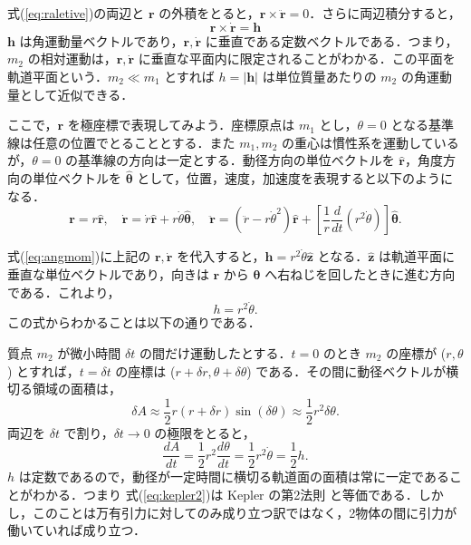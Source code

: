 \documentclass[11pt,a4paper,oneside,onecolumn]{jreport}
\begin{document}
式(\ref{eq:raletive})の両辺と ${\bm r}$ の外積をとると，${\bm r} \times \ddot{{\bm r}} = 0$．さらに両辺積分すると，
\begin{equation}
{\bm r} \times \dot{{\bm r}} = {\bm h} \label{eq:angmom}
\end{equation}
${\bm h}$ は角運動量ベクトルであり，${\bm r}, \dot{{\bm r}}$ に垂直である定数ベクトルである．つまり，$m_2$ の相対運動は，${\bm r}, \dot{{\bm r}}$ に垂直な平面内に限定されることがわかる．この平面を軌道平面という．$m_2 \ll m_1$ とすれば $h = |{\bm h}|$ は単位質量あたりの $m_2$ の角運動量として近似できる．

ここで，${\bm r}$ を極座標で表現してみよう．座標原点は $m_1$ とし，$\theta = 0$ となる基準線は任意の位置でとることとする．また $m_1, m_2$ の重心は慣性系を運動しているが，$\theta = 0$ の基準線の方向は一定とする．動径方向の単位ベクトルを $\hat{{\bm r}}$，角度方向の単位ベクトルを $\hat{{\bm \theta}}$ として，位置，速度，加速度を表現すると以下のようになる．
\begin{equation}
{\bm r} = r \hat{{\bm r}}, \quad \dot{{\bm r}} = \dot{r} \hat{{\bm r}} + r \dot{\theta} \hat{{\bm \theta}}, \quad \ddot{{\bm r}} = (\ddot{r} - r \dot{\theta}^2) \hat{{\bm r}} + \left[ \frac{1}{r} \frac{d}{dt} (r^2 \dot{\theta})\right] \hat{{\bm \theta}}. \label{eq:polar}
\end{equation}

式(\ref{eq:angmom})に上記の ${\bm r}, \dot{{\bm r}}$ を代入すると，${\bm h} = r^2 \dot{\theta} \hat{{\bm z}}$ となる．$\hat{{\bm z}}$ は軌道平面に垂直な単位ベクトルであり，向きは ${\bm r}$ から ${\bm \theta}$ へ右ねじを回したときに進む方向である．これより，
\begin{equation}
h = r^2 \dot{\theta}.
\end{equation}
この式からわかることは以下の通りである．

質点 $m_2$ が微小時間 $\delta t$ の間だけ運動したとする．$t = 0$ のとき $m_2$ の座標が ($r, \theta$) とすれば，$t = \delta t$ の座標は ($r + \delta r, \theta + \delta \theta$) である．その間に動径ベクトルが横切る領域の面積は，
\begin{equation}
\delta A \approx \frac{1}{2} r (r + \delta r) \sin (\delta \theta) \approx \frac{1}{2} r^2 \delta \theta. 
\end{equation}
両辺を $\delta t$ で割り，$\delta t \rightarrow 0$ の極限をとると，
\begin{equation}
\frac{dA}{dt} = \frac{1}{2} r^2 \frac{d \theta}{dt} = \frac{1}{2} r^2 \dot{\theta} = \frac{1}{2} h. \label{eq:kepler2}
\end{equation}
$h$ は定数であるので，動径が一定時間に横切る軌道面の面積は常に一定であることがわかる．つまり 式(\ref{eq:kepler2})は Kepler の第2法則 と等価である．しかし，このことは万有引力に対してのみ成り立つ訳ではなく，2物体の間に引力が働いていれば成り立つ．
\end{document}
